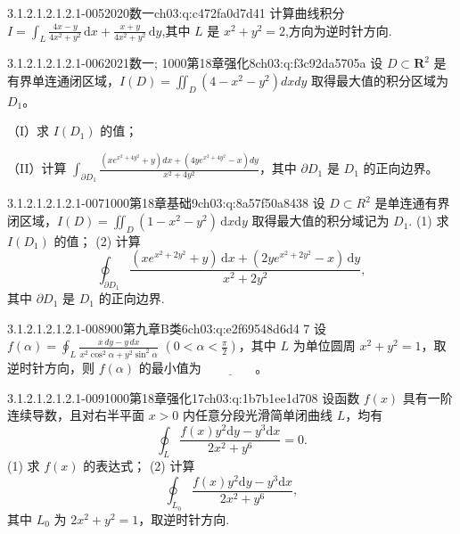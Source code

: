 \begin{q}{3.1.2.1.2.1.2.1-005}{2020数一}{ch03:q:c472fa0d7d41}
计算曲线积分 $\displaystyle I=\int_L \frac{4x-y}{4x^2+y^2}\,\mathrm{d}x+\frac{x+y}{4x^2+y^2}\,\mathrm{d}y$,其中 $L$ 是 $x^2+y^2=2$,方向为逆时针方向.
\end{q}

\begin{q}{3.1.2.1.2.1.2.1-006}{2021数一; 1000第18章强化8}{ch03:q:f3c92da5705a}
设 $D \subset \mathbf{R}^2$ 是有界单连通闭区域，$\displaystyle I(D) = \iint_D (4 - x^2 - y^2) dx dy$ 取得最大值的积分区域为 $D_1$。

（I）求 $I(D_1)$ 的值；

（II）计算 $\displaystyle \int_{\partial D_1} \frac{(x e^{x^2 + 4y^2} + y) dx + (4y e^{x^2 + 4y^2} - x) dy}{x^2 + 4y^2}$，其中 $\partial D_1$ 是 $D_1$ 的正向边界。
\end{q}

\begin{q}{3.1.2.1.2.1.2.1-007}{1000第18章基础9}{ch03:q:8a57f50a8438}
设 $D\subset R^2$ 是单连通有界闭区域，$\displaystyle I(D)=\iint_D(1-x^2-y^2)\,\mathrm{d}x\mathrm{d}y$ 取得最大值的积分域记为 $D_1$.
(1) 求 $I(D_1)$ 的值；
(2) 计算 \[\oint_{\partial D_1}\frac{(xe^{x^2+2y^2}+y)\,\mathrm{d}x+(2ye^{x^2+2y^2}-x)\,\mathrm{d}y}{x^2+2y^2},\] 其中 $\partial D_1$ 是 $D_1$ 的正向边界.
\end{q}

\begin{q}{3.1.2.1.2.1.2.1-008}{900第九章B类6}{ch03:q:e2f69548d6d4}
7 设 $\displaystyle f(\alpha)=\oint_{L}\frac{x\,dy-y\,dx}{x^{2}\cos^{2}\alpha+y^{2}\sin^{2}\alpha}$ $\left(0<\alpha<\frac{\pi}{2}\right)$，其中 $L$ 为单位圆周 $x^{2}+y^{2}=1$，取逆时针方向，则 $f(\alpha)$ 的最小值为 $\underline{\hspace{4em}}$。
\end{q}

\begin{q}{3.1.2.1.2.1.2.1-009}{1000第18章强化17}{ch03:q:1b7b1ee1d708}
设函数 $f(x)$ 具有一阶连续导数，且对右半平面 $x>0$ 内任意分段光滑简单闭曲线 $L$，均有
\[ \oint_L \frac{f(x)y^2\mathrm{d}y-y^3\mathrm{d}x}{2x^2+y^6}=0. \]
(1) 求 $f(x)$ 的表达式；
(2) 计算
\[ \oint_{L_0} \frac{f(x)y^2\mathrm{d}y-y^3\mathrm{d}x}{2x^2+y^6}, \]
其中 $L_0$ 为 $2x^2+y^2=1$，取逆时针方向.
\end{q}

